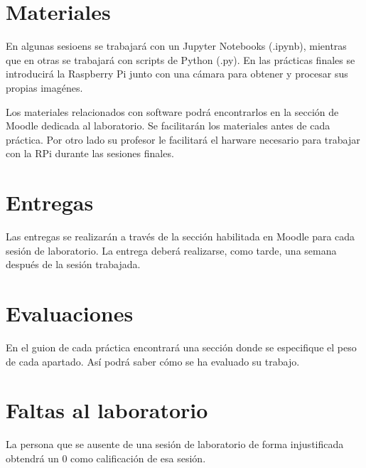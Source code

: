 \section{Materiales}
En algunas sesioens se trabajará con un Jupyter Notebooks (.ipynb), mientras que en otras se trabajará con scripts de Python (.py). En las prácticas finales se introducirá la Raspberry Pi junto con una cámara para obtener y procesar sus propias imagénes.

Los materiales relacionados con software podrá encontrarlos en la sección de Moodle dedicada al laboratorio. Se facilitarán los materiales antes de cada práctica. Por otro lado su profesor le facilitará el harware necesario para trabajar con la RPi durante las sesiones finales.

\section{Entregas}
Las entregas se realizarán a través de la sección habilitada en Moodle para cada sesión de laboratorio. La entrega deberá realizarse, como tarde, una semana después de la sesión trabajada.

\section{Evaluaciones}
En el guion de cada práctica encontrará una sección donde se especifique el peso de cada apartado. Así podrá saber cómo se ha evaluado su trabajo.

\section{Faltas al laboratorio}
La persona que se ausente de una sesión de laboratorio de forma injustificada obtendrá un 0 como calificación de esa sesión.